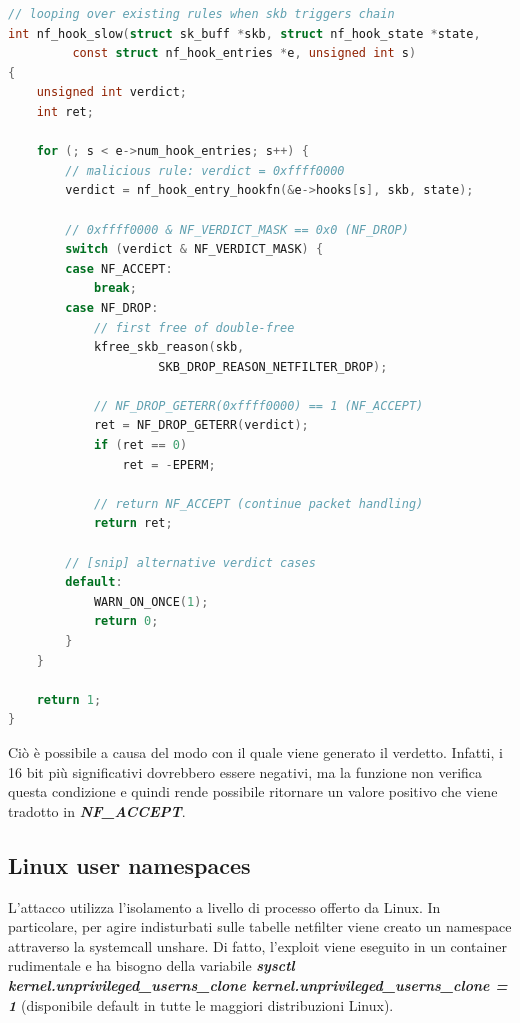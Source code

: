 \documentclass{article}
\begin{document}
\begin{lstlisting}[language=C,style=CStyle,caption="Funzione nf_hook_slow che genera la vulnerabilit"]
// looping over existing rules when skb triggers chain
int nf_hook_slow(struct sk_buff *skb, struct nf_hook_state *state,
         const struct nf_hook_entries *e, unsigned int s)
{
    unsigned int verdict;
    int ret;

    for (; s < e->num_hook_entries; s++) {
        // malicious rule: verdict = 0xffff0000
        verdict = nf_hook_entry_hookfn(&e->hooks[s], skb, state);  

        // 0xffff0000 & NF_VERDICT_MASK == 0x0 (NF_DROP)
        switch (verdict & NF_VERDICT_MASK) {  
        case NF_ACCEPT:
            break;
        case NF_DROP:
            // first free of double-free
            kfree_skb_reason(skb,
                     SKB_DROP_REASON_NETFILTER_DROP);  
            
            // NF_DROP_GETERR(0xffff0000) == 1 (NF_ACCEPT)
            ret = NF_DROP_GETERR(verdict);  
            if (ret == 0)
                ret = -EPERM;
            
            // return NF_ACCEPT (continue packet handling)
            return ret;  

        // [snip] alternative verdict cases
        default:
            WARN_ON_ONCE(1);
            return 0;
        }
    }

    return 1;
}
\end{lstlisting}

Ciò è possibile a causa del modo con il quale viene generato il verdetto. Infatti, i 16 bit 
più significativi dovrebbero essere negativi, ma la funzione non verifica questa condizione 
e quindi rende possibile ritornare un valore positivo che viene tradotto in 
\textbf{\textit{NF\_ACCEPT}}\cite{Patch}.

\subsection{Linux user namespaces} 
L'attacco utilizza l'isolamento a livello di processo offerto da Linux. In particolare, 
per agire indisturbati sulle tabelle netfilter viene creato un namespace attraverso la 
systemcall unshare. Di fatto, l'exploit viene eseguito in un container rudimentale 
e ha bisogno della variabile \textbf{\textit{sysctl kernel.unprivileged\_userns\_clone
kernel.unprivileged\_userns\_clone = 1}} (disponibile default in tutte le maggiori 
distribuzioni Linux). 
\end{document}
